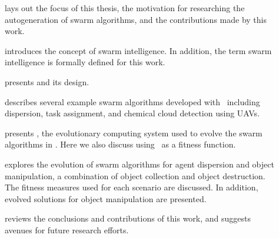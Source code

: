 \begin{description}
\item[] lays out the focus of this thesis, the motivation for researching the autogeneration of swarm algorithms, and the contributions made by this work.
\item[] introduces the concept of swarm intelligence.  In addition, the term swarm intelligence is formally defined for this work.
\item[] presents \SWEEP{} and its design.
\item[] describes several example swarm algorithms developed with \SWEEP\ including dispersion, task assignment, and chemical cloud detection using UAVs.
\item[] presents \ECS, the evolutionary computing system used to evolve the swarm algorithms in .  Here we also discuss using \SWEEP\ as a fitness function.
\item[] explores the evolution of swarm algorithms for agent dispersion and object manipulation, a combination of object collection and object destruction.  The fitness measures used for each scenario are discussed.  In addition, evolved solutions for object manipulation are presented.
\item[] reviews the conclusions and contributions of this work, and suggests avenues for future research efforts.
\end{description}
